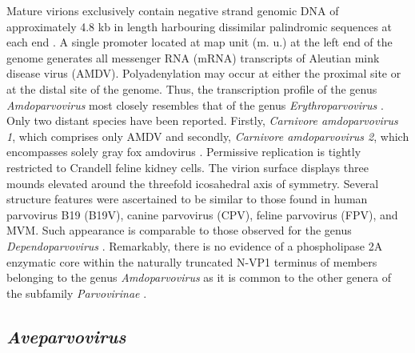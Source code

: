 Mature virions exclusively contain negative strand genomic DNA of approximately 4.8 kb in length harbouring dissimilar palindromic sequences at each end \cite{pmid6252342, pmid2843669}. A single promoter located at map unit (m. u.) at the left end of the genome generates all messenger RNA (mRNA) transcripts of Aleutian mink disease virus (AMDV).  Polyadenylation may occur at either the proximal site or at the distal site of the genome. Thus, the transcription profile of the genus \textit{Amdoparvovirus} most closely resembles  that of the genus \textit{Erythroparvovirus} \cite{pmid16378968}.  
Only two distant species have been reported. Firstly, \textit{Carnivore amdoparvovirus 1}, which comprises only AMDV and secondly, \textit{Carnivore amdoparvovirus 2}, which encompasses solely gray fox amdovirus \cite{pmid22000359}. 
Permissive replication is tightly restricted to Crandell feline kidney cells. The virion surface displays three mounds elevated around the threefold icosahedral axis of symmetry. Several structure features were ascertained to be similar to those found in human parvovirus B19 (B19V), canine parvovirus (CPV), feline parvovirus (FPV), and MVM. Such appearance is comparable to those observed for the genus \textit{Dependoparvovirus} \cite{pmid10400786}. Remarkably, there is no evidence of a phospholipase 2A enzymatic core within the naturally truncated N-VP1 terminus of members belonging to the genus \textit{Amdoparvovirus} as it is common to the other genera of the subfamily \textit{Parvovirinae} \cite{icvt}. 



\subsection{\textit{Aveparvovirus}}


